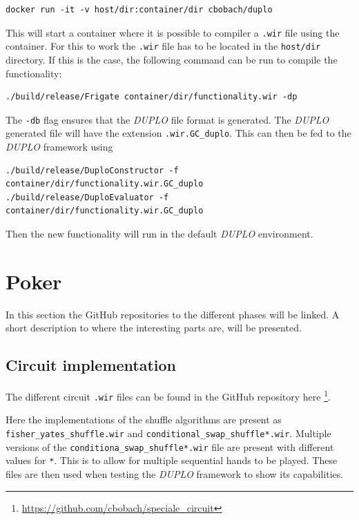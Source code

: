 \documentclass[twoside,11pt,openright]{report}
\newcommand{\DUPLO}{\textit{DUPLO} }
\begin{document}
\begin{appendices}
\begin{center}
\begin{verbatim}
docker run -it -v host/dir:container/dir cbobach/duplo
\end{verbatim}
\end{center}

This will start a container where it is possible to compiler a \verb|.wir| file using the container. For this to work the \verb|.wir| file has to be located in the \verb|host/dir| directory. If this is the case, the following command can be run to compile the functionality:

\begin{center}
\begin{verbatim}
./build/release/Frigate container/dir/functionality.wir -dp
\end{verbatim}
\end{center}

The \verb|-db| flag ensures that the \DUPLO file format is generated. The \DUPLO generated file will have the extension \verb|.wir.GC_duplo|. This can then be fed to the \DUPLO framework using

\begin{center}
\begin{verbatim}
./build/release/DuploConstructor -f container/dir/functionality.wir.GC_duplo
./build/release/DuploEvaluator -f container/dir/functionality.wir.GC_duplo
\end{verbatim}
\end{center}

Then the new functionality will run in the default \DUPLO environment.

\section{Poker}
\label{app:poker}
In this section the GitHub repositories to the different phases will be linked. A short description to where the interesting parts are, will be presented.

\subsection{Circuit implementation}
\label{app:circuit-impl}
The different circuit \verb|.wir| files can be found in the GitHub repository here \footnote{\url{https://github.com/cbobach/speciale_circuit}}.

Here the implementations of the shuffle algorithms are present as \verb|fisher_yates_shuffle.wir| and \verb|conditional_swap_shuffle*.wir|. Multiple versions of the \verb|conditiona_swap_shuffle*.wir| file are present with different values for \verb|*|. This is to allow for multiple sequential hands to be played. These files are then used when testing the \DUPLO framework to show its capabilities.


\end{appendices}
\end{document}
